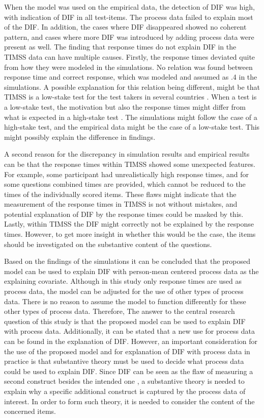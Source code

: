 \documentclass{interact}
\begin{document}
When the model was used on the empirical data, the detection of DIF was high, with indication of DIF in all test-items. The process data failed to explain most of the DIF. In addition, the cases where DIF disappeared showed no coherent pattern, and cases where more DIF was introduced by adding process data were present as well. The finding that response times do not explain DIF in the TIMSS data can have multiple causes. Firstly, the response times deviated quite from how they were modeled in the simulations. No relation was found between response time and correct response, which was modeled and assumed as .4 in the simulations. A possible explanation for this relation being different, might be that TIMSS is a low-stake test for the test takers in several countries \parencite{TIMSS}. When a test is a low-stake test, the motivation but also the response times might differ from what is expected in a high-stake test \parencite{wise2009correlates, finn2015measuring}. The simulations might follow the case of a high-stake test, and the empirical data might be the case of a low-stake test. This might possibly explain the difference in findings.

A second reason for the discrepancy in simulation results and empirical results can be that the response times within TIMSS showed some unexpected features. For example, some participant had unrealistically high response times, and for some questions combined times are provided, which cannot be reduced to the times of the individually scored items. These flaws might indicate that the measurement of the response times in TIMSS is not without mistakes, and potential explanation of DIF by the response times could be masked by this. Lastly, within TIMSS the DIF might correctly not be explained by the response times. However, to get more insight in whether this would be the case, the items should be investigated on the substantive content of the questions.

Based on the findings of the simulations it can be concluded that the proposed model can be used to explain DIF with person-mean centered process data as the explaining covariate. Although in this study only response times are used as process data, the model can be adjusted for the use of other types of process data. There is no reason to assume the model to function differently for these other types of process data. Therefore, The answer to the central research question of this study is that the proposed model can be used to explain DIF with process data. Additionally, it can be stated that a new use for process data can be found in the explanation of DIF. However, an important consideration for the use of the proposed model and for explanation of DIF with process data in practice is that substantive theory must be used to decide what process data could be used to explain DIF. Since DIF can be seen as the flaw of measuring a second construct besides the intended one \parencite{ackerman1992didactic}, a substantive theory is needed to explain why a specific additional construct is captured by the process data of interest. In order to form such theory, it is needed to consider the content of the concerned items.
\end{document}
